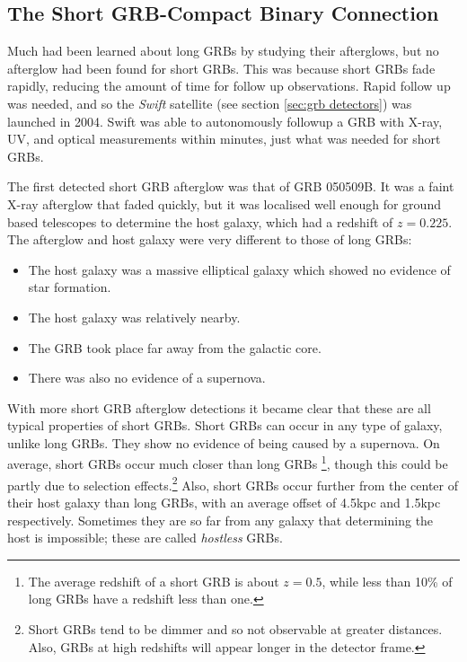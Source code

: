\documentclass[11pt]{cuthesis}
\begin{document}
\subsection{The Short GRB-Compact Binary Connection} \label{sec: short grbs}
Much had been learned about long GRBs by studying their afterglows, but no afterglow had been found for short GRBs. This was because short GRBs fade rapidly, reducing the amount of time for follow up observations. Rapid follow up was needed, and so the \textit{Swift} satellite (see section \ref{sec:grb detectors}) was launched in 2004. Swift was able to autonomously followup a GRB with X-ray, UV, and optical measurements within minutes, just what was needed for short GRBs. 

The first detected short GRB afterglow was that of GRB 050509B. It was a faint X-ray afterglow that faded quickly, but it was localised well enough for ground based telescopes to determine the host galaxy, which had a redshift of $z=0.225$. The afterglow and host galaxy were very different to those of long GRBs:
\begin{itemize}
\item The host galaxy was a massive elliptical galaxy which showed no evidence of star formation.
\item The host galaxy was relatively nearby.
\item The GRB took place far away from the galactic core.
\item There was also no evidence of a supernova.
\end{itemize} 
With more short GRB afterglow detections it became clear that these are all typical properties of short GRBs. Short GRBs can occur in any type of galaxy, unlike long GRBs. They show no evidence of being caused by a supernova. On average, short GRBs occur much closer than long GRBs \footnote{The average redshift of a short GRB is about $z=0.5$, while less than 10\% of long GRBs have a redshift less than one.\cite{Le:2017jua}}, though this could be partly due to selection effects.\footnote{Short GRBs tend to be dimmer and so not observable at greater distances. Also, GRBs at  high redshifts will appear longer in the detector frame.}  Also, short GRBs occur further from the center of their host galaxy than long GRBs, with an average offset of 4.5kpc and 1.5kpc respectively. Sometimes they are so far from any galaxy that determining the host is impossible; these are called \textit{hostless} GRBs.
\end{document}
